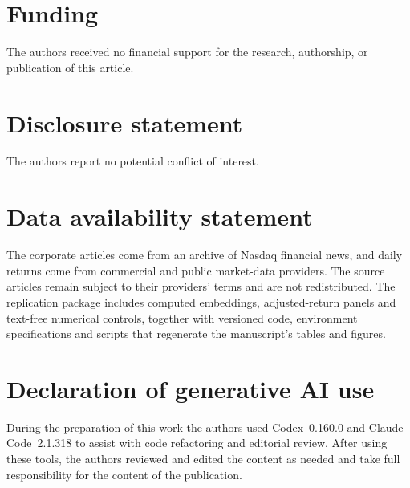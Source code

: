 \section*{Funding}

The authors received no financial support for the research, authorship, or
publication of this article.

\section*{Disclosure statement}

The authors report no potential conflict of interest.

\section*{Data availability statement}

The corporate articles come from an archive of Nasdaq financial news, and daily
returns come from commercial and public market-data providers.
The source articles remain subject to their providers' terms and are not
redistributed. The replication package includes computed embeddings,
adjusted-return panels and text-free numerical controls, together with versioned
code, environment specifications and scripts that regenerate the manuscript's
tables and figures.

\section*{Declaration of generative AI use}

During the preparation of this work the authors used Codex~0.160.0 and
Claude Code~2.1.318 to assist with code refactoring and editorial review.
After using these tools, the authors reviewed and edited the content as needed
and take full responsibility for the content of the publication.
